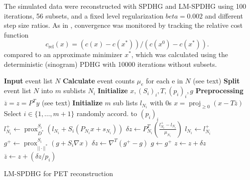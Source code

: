 \documentclass{IEEEtran}
\DeclareMathOperator{\proj}{proj}
\DeclareMathOperator{\prox}{prox}
\begin{document}
The simulated data were reconstructed with SPDHG and LM-SPDHG using 100 iterations, 56 subsets,
and a fixed level regularization $beta = 0.002$ and different step size ratios.
As in \cite{Ehrhardt2019}, convergence was monitored by tracking the relative cost function
\[ c_\text{rel}(x) = (c(x) - c(x^*)) / (c(x^0) - c(x^*)). \]
compared to an approximate minimizer $x^*$,
which was calculated using the deterministic (sinogram) PDHG with 10000 iterations without subsets.


\begin{algorithm}[t]
\begin{algorithmic}[1]
\footnotesize
\State \textbf{Input} event list $N$
\State \textbf{Calculate} event counts $\mu_e$ for each e in $N$ (see text)
\State \textbf{Split} event list $N$ into $m$ sublists $N_i$
\State \textbf{Initialize} $x,(S_i)_i,T,(p_i)_i,g$
\State \textbf{Preprocessing} $\overline{z} = z = P^T y$ (see text)
\State \textbf{Initialize} $m$ sub lists $l_{N_i}$ with 0s
\Repeat
	\State $x = \proj_{\geq 0} (x - T \overline{z})$
	\State Select $i \in \{1,\ldots,m+1\}$ randomly accord. to $(p_i)_i$
	  \State $l_{N_i}^+ \gets \prox_{D^*}^{S_i} \left( l_{N_i} + S_i \left(P_{N_i} x + s_{N_i} \right) \right)$
	  \State $\delta z \gets P_{N_i}^T \left(\frac{l_{N_i}^+ - l_{N_i}}{\mu_{N_i}}\right)$
	  \State $l_{N_i} \gets l_{N_i}^+$
  \Else
	  \State $g^+ \gets \prox_{||\cdot||^*}^{S_i} \left( g + S_i \nabla x \right)$
	  \State $\delta z \gets \nabla^T \left(g^+ - g\right)$
	  \State $g \gets g^+$
  \EndIf
	\State $z \gets z + \delta z$
	\State $\overline{z} \gets  z + (\delta z/p_i)$
\State {}
\end{algorithmic}
\caption{LM-SPDHG for PET reconstruction}
\label{alg:lmspdhg}
\end{algorithm}
\end{document}
